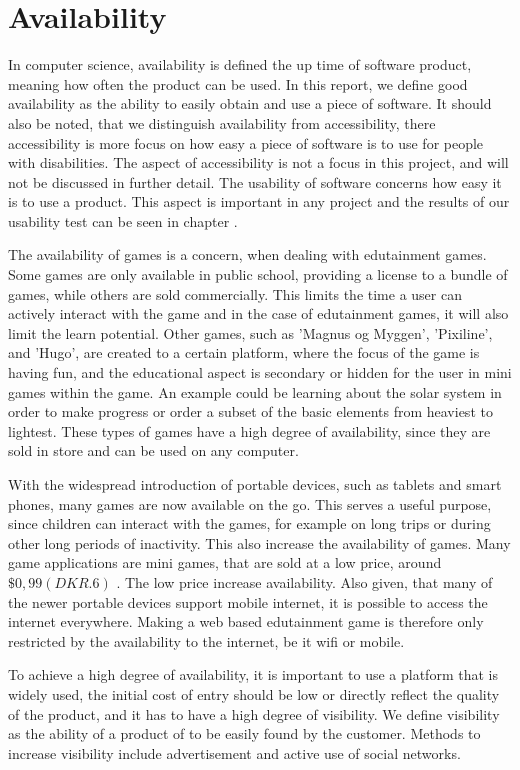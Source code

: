 \section{Availability}
\label{sec:availability}

In computer science, availability is defined the up time of software product, meaning how often the product can be used. In this report, we define good availability as the ability to easily obtain and use a piece of software. It should also be noted, that we distinguish availability from accessibility, there accessibility is more focus on how easy a piece of software is to use for people with disabilities. The aspect of accessibility is not a focus in this project, and will not be discussed in further detail. The usability of software concerns how easy it is to use a product. This aspect is important in any project and the results of our usability test can be seen in chapter .

The availability of games is a concern, when dealing with edutainment games. Some games are only available in public school, providing a license to a bundle of games, while others are sold commercially. This limits the time a user can actively interact with the game and in the case of edutainment games, it will also limit the learn potential. Other games, such as 'Magnus og Myggen', 'Pixiline', and 'Hugo', are created to a certain platform, where the focus of the game is having fun, and the educational aspect is secondary or hidden for the user in mini games within the game. An example could be learning about the solar system in order to make progress or order a subset of the basic elements from heaviest to lightest. These types of games have a high degree of availability, since they are sold in store and can be used on any computer.

With the widespread introduction of portable devices, such as tablets and smart phones, many games are now available on the go. This serves a useful purpose, since children can interact with the games, for example on long trips or during other long periods of inactivity. This also increase the availability of games. Many game applications are mini games, that are sold at a low price, around $\$0,99 (DKR. 6)$ . The low price increase availability. Also given, that many of the newer portable devices support mobile internet, it is possible to access the internet everywhere. Making a web based edutainment game is therefore only restricted by the availability to the internet, be it wifi or mobile.

To achieve a high degree of availability, it is important to use a platform that is widely used, the initial cost of entry should be low or directly reflect the quality of the product, and it has to have a high degree of visibility. We define visibility as the ability of a product of to be easily found by the customer. Methods to increase visibility include advertisement and active use of social networks.